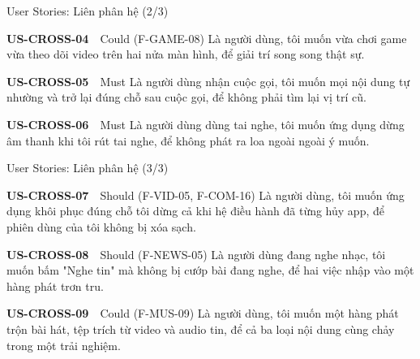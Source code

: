 \begin{frame}{User Stories: Liên phân hệ (2/3)}
\linespread{0.85}
\begin{block}{\scriptsize\bfseries US-CROSS-04}~~Could \tiny(F-GAME-08)
{\scriptsize Là người dùng, tôi muốn vừa chơi game vừa theo dõi video trên hai nửa màn hình, để giải trí song song thật sự.}
\end{block}
\vspace{1pt}
\begin{block}{\scriptsize\bfseries US-CROSS-05}~~Must
{\scriptsize Là người dùng nhận cuộc gọi, tôi muốn mọi nội dung tự nhường và trở lại đúng chỗ sau cuộc gọi, để không phải tìm lại vị trí cũ.}
\end{block}
\vspace{1pt}
\begin{block}{\scriptsize\bfseries US-CROSS-06}~~Must
{\scriptsize Là người dùng dùng tai nghe, tôi muốn ứng dụng dừng âm thanh khi tôi rút tai nghe, để không phát ra loa ngoài ngoài ý muốn.}
\end{block}
\vspace{1pt}
\end{frame}

\begin{frame}{User Stories: Liên phân hệ (3/3)}
\linespread{0.85}
\begin{block}{\scriptsize\bfseries US-CROSS-07}~~Should \tiny(F-VID-05, F-COM-16)
{\scriptsize Là người dùng, tôi muốn ứng dụng khôi phục đúng chỗ tôi dừng cả khi hệ điều hành đã từng hủy app, để phiên dùng của tôi không bị xóa sạch.}
\end{block}
\vspace{1pt}
\begin{block}{\scriptsize\bfseries US-CROSS-08}~~Should \tiny(F-NEWS-05)
{\scriptsize Là người dùng đang nghe nhạc, tôi muốn bấm "Nghe tin" mà không bị cướp bài đang nghe, để hai việc nhập vào một hàng phát trơn tru.}
\end{block}
\vspace{1pt}
\begin{block}{\scriptsize\bfseries US-CROSS-09}~~Could \tiny(F-MUS-09)
{\scriptsize Là người dùng, tôi muốn một hàng phát trộn bài hát, tệp trích từ video và audio tin, để cả ba loại nội dung cùng chảy trong một trải nghiệm.}
\end{block}
\vspace{1pt}
\end{frame}





